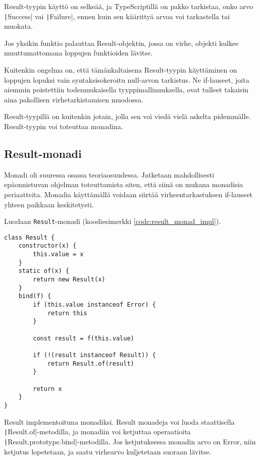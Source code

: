 Result-tyypin käyttö on selkeää, ja TypeScriptillä on pakko tarkistaa, onko arvo \texttt|Success| vai \texttt|Failure|, ennen kuin sen käärittyä arvoa voi tarkastella tai muokata.

Jos yksikin funktio palauttaa Result-objektin, jossa on virhe, objekti kulkee muuttumattomana loppujen funktioiden lävitse.

Kuitenkin ongelma on, että tämänkaltaisena Result-tyypin käyttäminen on loppujen lopuksi vain syntaksisokeroitu null-arvon tarkistus. Ne if-lauseet, joita aiemmin poistettiin todenmukaisella tyyppimallinnuksella, ovat tulleet takaisin aina pakollisen virhetarkistamisen muodossa.

Result-tyypillä on kuitenkin jotain, jolla sen voi viedä vielä askelta pidemmälle. Result-tyypin voi toteuttaa monadina.


\subsection{Result-monadi}

Monadi oli suuressa osassa teoriaosuudessa. Jatketaan mahdollisesti epäonnistuvan ohjelman toteuttamista siten, että siinä on mukana monadisia periaatteita. Monadia käyttämällä voidaan siirtää virheentarkastuksen if-lauseet yhteen paikkaan keskitetysti.

Luodaan \texttt{Result}-monadi (koodiesimerkki \ref{code:result_monad_impl}).


\begin{code}
    \begin{verbatim}
class Result {
    constructor(x) {
        this.value = x
    }
    static of(x) {
        return new Result(x)
    }
    bind(f) {
        if (this.value instanceof Error) {
            return this
        }

        const result = f(this.value)

        if (!(result instanceof Result)) {
            return Result.of(result)
        }

        return x
    }
}
\end{verbatim}
    \caption{Result implementoituna monadiksi. Result monadeja voi luoda staattisella \texttt|Result.of|-metodilla, ja monadiin voi ketjuttaa operaatioita \texttt|Result.prototype.bind|-metodilla. Jos ketjutuksessa monadin arvo on Error, niin ketjutus lopetetaan, ja saatu virhearvo kuljetetaan suoraan lävitse.}
    \label{code:result_monad_impl}
\end{code}

